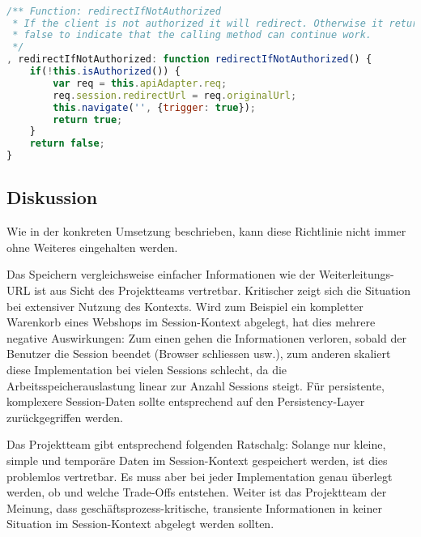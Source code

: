 \begin{lstlisting}[language=JavaScript, caption=Router - Autorisationskontrolle \cite{roomiesRouter}, label=lst:router-set-redirecturl, firstnumber=225]

/** Function: redirectIfNotAuthorized
 * If the client is not authorized it will redirect. Otherwise it returns
 * false to indicate that the calling method can continue work.
 */
, redirectIfNotAuthorized: function redirectIfNotAuthorized() {
	if(!this.isAuthorized()) {
		var req = this.apiAdapter.req;
		req.session.redirectUrl = req.originalUrl;
		this.navigate('', {trigger: true});
		return true;
	}
	return false;
}
\end{lstlisting}


\subsection*{Diskussion}
Wie in der konkreten Umsetzung beschrieben, kann diese Richtlinie nicht immer ohne Weiteres eingehalten werden.

Das Speichern vergleichsweise einfacher Informationen wie der Weiterleitungs-\gls{URL} ist aus Sicht des Projektteams vertretbar. Kritischer zeigt sich die Situation bei extensiver Nutzung des Kontexts. Wird zum Beispiel ein kompletter Warenkorb eines Webshops im Session-Kontext abgelegt, hat dies mehrere negative Auswirkungen: Zum einen gehen die Informationen verloren, sobald der Benutzer die Session beendet (Browser schliessen usw.), zum anderen skaliert diese Implementation bei vielen Sessions schlecht, da die Arbeitsspeicherauslastung linear zur Anzahl Sessions steigt. Für persistente, komplexere Session-Daten sollte entsprechend auf den Persistency-Layer zurückgegriffen werden.

Das Projektteam gibt entsprechend folgenden Ratschalg: Solange nur kleine, simple und temporäre Daten im Session-Kontext gespeichert werden, ist dies problemlos vertretbar. Es muss aber bei jeder Implementation genau überlegt werden, ob und welche Trade-Offs entstehen.
Weiter ist das Projektteam der Meinung, dass geschäftsprozess-kritische, transiente Informationen in keiner Situation im Session-Kontext abgelegt werden sollten.